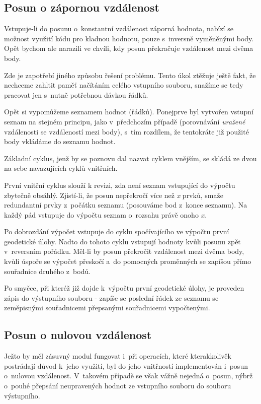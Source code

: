 \subsection{Posun o zápornou vzdálenost}
\label{zapornavzdalenost}

Vstupuje-li do posunu o~konstantní vzdálenost záporná hodnota, nabízí se možnost
využití kódu pro kladnou hodnotu, pouze s~inversně vyměněnými body. Opět bychom ale narazili
ve chvíli, kdy posun překračuje vzdálenost mezi dvěma body. 

Zde je zapotřebí jiného způsobu řešení problému. Tento úkol ztěžuje ještě fakt, že nechceme
zahltit paměť načítáním celého vstupního souboru, snažíme se tedy pracovat jen s~nutně
potřebnou dávkou řádků. 

Opět si vypomůžeme seznamem hodnot (řádků). Ponejprve byl vytvořen vstup\-ní seznam
na stejném principu, jako v~předchozím případě (porovnávání \textit{uražené} vzdálenosti se
vzdáleností mezi body), s~tím rozdílem, že tentokráte již použité body vkládáme do seznamu hodnot.

Základní cyklus, jenž by se poznovu dal nazvat cyklem vnějším, se skládá ze dvou na sebe
navazujících cyklů vnitřních. 

První vnitřní cyklus slouží k revizi, zda není seznam vstupující do výpočtu zbytečně obsáhlý.
Zjistí-li, že posun nepřekročí více než \textit{x} prvků, smaže redundantní prvky z~počátku seznamu (posouváme bod
z~konce seznamu). Na každý pád vstupuje do výpočtu seznam o~rozsahu právě onoho \textit{x}. 

Po dobrozdání výpočet vstupuje do cyklu spočívajícího ve výpočtu první geode\-tické úlohy.
Nadto do tohoto cyklu vstupují hodnoty kvůli posunu zpět v~reversním pořádku. Měl-li by
posun překročit vzdálenost mezi dvěma body, kvůli úspoře se výpočet přeskočí a~do pomocných
proměnných se zapíšou přímo souřadnice druhého z~bodů. 

Po smyčce, při kteréž již dojde k~výpočtu první geodetické úlohy, je proveden zápis do výstupního
souboru - zapíše se poslední řádek ze seznamu se zeměpisnými souřadnicemi přepsanými
souřadnicemi vypočtenými. 

\subsection{Posun o nulovou vzdálenost}
\label{nulovavzdalenost}

Ježto by měl zásuvný modul fungovat i~při
operacích, které kterakkolivěk postrádají důvod k~jeho využití, byl do jeho
vnitřností implementován i~posun o~nulovou vzdálenost.
V~takovém případě se však vážně nejedná o~posun, nýbrž o~pouhé přepsání
neupravených hodnot ze vstupního souboru do souboru výstupního. 

